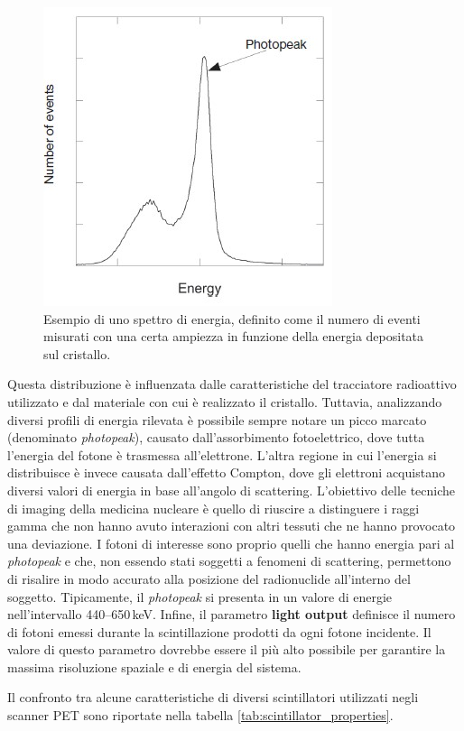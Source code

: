 \begin{figure}[h!]
	\centering
	\includegraphics[width=0.38\linewidth]{./ImageFiles/Photo peak.jpg}
	\caption{Esempio di uno spettro di energia, definito come il numero di eventi misurati con una certa ampiezza in funzione della energia depositata sul cristallo\cite{Bailey2014}.}
	\label{fig:photo_peak}
\end{figure}
Questa distribuzione è influenzata dalle caratteristiche del tracciatore radioattivo utilizzato e dal materiale con cui è realizzato il cristallo. Tuttavia, analizzando diversi profili di energia rilevata è possibile sempre notare un picco marcato (denominato \textit{photopeak}), causato dall'assorbimento fotoelettrico, dove tutta l'energia del fotone è trasmessa all'elettrone. L'altra regione in cui l'energia si distribuisce è invece causata dall'effetto Compton, dove gli elettroni acquistano diversi valori di energia in base all'angolo di scattering. L'obiettivo delle tecniche di imaging della medicina nucleare è quello di riuscire a distinguere i raggi gamma che non hanno avuto interazioni con altri tessuti che ne hanno provocato una deviazione. I fotoni di interesse sono proprio quelli che hanno energia pari al \textit{photopeak} e che, non essendo stati soggetti a fenomeni di scattering, permettono di risalire in modo accurato alla posizione del radionuclide all'interno del soggetto. Tipicamente, il \textit{photopeak} si presenta in un valore di energie nell'intervallo \numrange[range-phrase=--]{440}{650}\,\unit{\kilo\electronvolt}. Infine, il parametro \textbf{light output} definisce il numero di fotoni emessi durante la scintillazione prodotti da ogni fotone incidente. Il valore di questo parametro dovrebbe essere il più alto possibile per garantire la massima risoluzione spaziale e di energia del sistema.

\noindent
Il confronto tra alcune caratteristiche di diversi scintillatori utilizzati negli scanner PET sono riportate nella tabella \ref{tab:scintillator_properties}.

